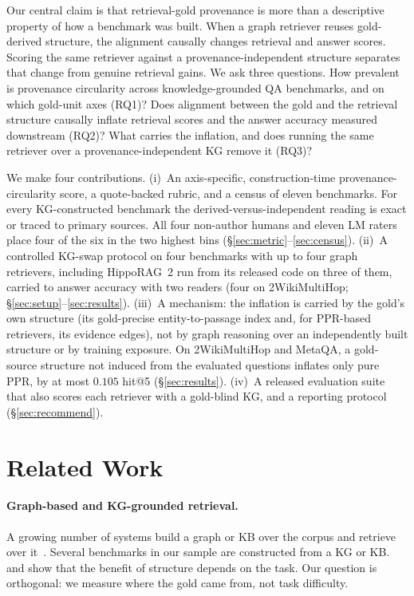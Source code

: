 \documentclass[11pt]{article}
\begin{document}
Our central claim is that retrieval-gold provenance is more than a descriptive property of how a benchmark was built. When a graph retriever reuses gold-derived structure, the alignment causally changes retrieval and answer scores. Scoring the same retriever against a provenance-independent structure separates that change from genuine retrieval gains. We ask three questions. How prevalent is provenance circularity across knowledge-grounded QA benchmarks, and on which gold-unit axes (RQ1)? Does alignment between the gold and the retrieval structure causally inflate retrieval scores and the answer accuracy measured downstream (RQ2)? What carries the inflation, and does running the same retriever over a provenance-independent KG remove it (RQ3)?

We make four contributions. (i)~An axis-specific, construction-time provenance-circularity score, a quote-backed rubric, and a census of eleven benchmarks. For every KG-constructed benchmark the derived-versus-independent reading is exact or traced to primary sources. All four non-author humans and eleven LM raters place four of the six in the two highest bins (\S\ref{sec:metric}--\ref{sec:census}). (ii)~A controlled KG-swap protocol on four benchmarks with up to four graph retrievers, including HippoRAG~2 run from its released code on three of them, carried to answer accuracy with two readers (four on 2WikiMultiHop; \S\ref{sec:setup}--\ref{sec:results}). (iii)~A mechanism: the inflation is carried by the gold's own structure (its gold-precise entity-to-passage index and, for PPR-based retrievers, its evidence edges), not by graph reasoning over an independently built structure or by training exposure. On 2WikiMultiHop and MetaQA, a gold-source structure not induced from the evaluated questions inflates only pure PPR, by at most $0.105$ hit@5 (\S\ref{sec:results}). (iv)~A released evaluation suite that also scores each retriever with a gold-blind KG, and a reporting protocol (\S\ref{sec:recommend}).

\section{Related Work}
\label{sec:related}
\paragraph{Graph-based and KG-grounded retrieval.} A growing number of systems build a graph or KB over the corpus and retrieve over it~\citep{edge2024graphrag,gutierrez2024hipporag,gutierrez2025hipporag2}. Several benchmarks in our sample are constructed from a KG or KB. \citet{graphragbench2025} and \citet{han2025ragvsgraphrag} show that the benefit of structure depends on the task. Our question is orthogonal: we measure where the gold came from, not task difficulty.
\end{document}
